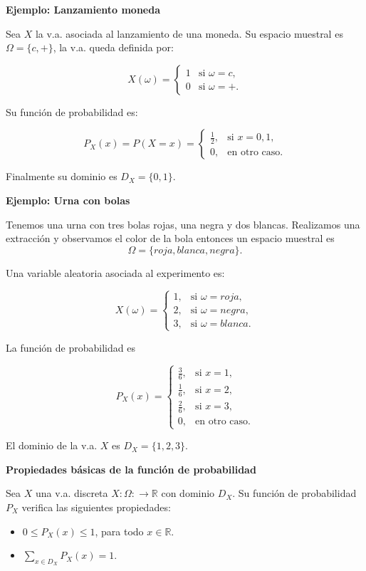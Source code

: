 \documentclass[]{book}
\providecommand{\tightlist}{%
  \setlength{\itemsep}{0pt}\setlength{\parskip}{0pt}}
\begin{document}
\textbf{Ejemplo: Lanzamiento moneda}

Sea \(X\) la v.a. asociada al lanzamiento de una moneda. Su espacio muestral es \(\Omega=\{c,+\}\), la v.a. queda definida por:

\[X(\omega)=\left\{\begin{array}{ll} 1 & \mbox{si } \omega=c, \\
0 & \mbox{si }\omega=+.\end{array}\right.\]

Su función de probabilidad es:

\[P_{X}(x)=P(X=x)=\left\{\begin{array}{ll} \frac12, & \mbox{si } x=0,1,\\
0, & \mbox{en otro caso.}\end{array}\right.\]

Finalmente su dominio es \(D_X=\{0,1\}.\)

\textbf{Ejemplo: Urna con bolas}

Tenemos una urna con tres bolas rojas, una negra y dos blancas. Realizamos una extracción y observamos el color de la bola entonces un espacio muestral es
\[\Omega=\{roja, blanca, negra\}.\]

Una variable aleatoria asociada al experimento es:

\[X(\omega)=\left\{\begin{array}{ll} 1, & \mbox{si } \omega=roja,  \\
2, & \mbox{si }\omega=negra, \\ 3, & \mbox{si } \omega=blanca. \end{array}\right.\]

La función de probabilidad es

\[P_{X}(x)=\left\{\begin{array}{ll} \frac36, & \mbox{si } x=1,\\[1ex]
\frac16, & \mbox{si } x=2,\\[1ex] \frac26, & \mbox{si } x=3,\\[1ex] 0, & \mbox{en otro
caso.}\end{array}\right.\]

El dominio de la v.a. \(X\) es \(D_X=\{1,2,3\}.\)

\textbf{Propiedades básicas de la función de probabilidad}

Sea \(X\) una v.a. discreta \(X:\Omega:\to\mathbb{R}\) con dominio \(D_X\). Su función de probabilidad \(P_{X}\) verifica las siguientes propiedades:

\begin{itemize}
\tightlist
\item
  \(0\leq P_{X}(x)\leq 1\), para todo \(x\in\mathbb{R}\).
\item
  \(\sum\limits_{x\in D_X} P_{X}(x)=1\).
\end{itemize}
\end{document}
